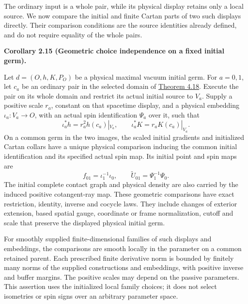 \documentclass[
  english,
  11pt,
  reqno]{amsart}
\makeatletter
\newcommand{\pandocstatementheading}[1]{%
  \par\if@nobreak\else
    \addpenalty{\@beginparpenalty}%
    \addvspace{.5\baselineskip plus .2\baselineskip minus .2\baselineskip}%
  \fi
  {\normalfont\bfseries #1\par}%
  \nobreak\@afterindenttrue\@afterheading
}
\makeatother
\begin{document}
The ordinary input is a whole pair, while its physical display retains
only a local source. We now compare the initial and finite Cartan parts
of two such displays directly. Their comparison conditions are the
source identities already defined, and do not require equality of the
whole pairs.

\pandocstatementheading{\leavevmode{}\label{cor:online-fixed-slice-geometric-choice-independence}Corollary 2.15 (Geometric choice independence on a fixed initial germ).}

Let \(d=(O,h,K,P_O)\) be a physical maximal vacuum initial germ. For
\(a=0,1\), let \(c_a\) be an ordinary pair in the selected domain of
\hyperref[thm:online-ordinary-negative-response-initial-source]{Theorem
4.18}. Execute the pair on its whole domain and restrict its actual
initial source to \(V_a\). Supply a positive scale \(r_a\), constant on
that spacetime display, and a physical embedding \(\iota_a:V_a\to O\),
with an actual spin identification \(\Psi_a\) over it, such that%
 \[
\iota_a^*h=r_a^2h(c_a)|_{V_a},\qquad
\iota_a^*K=r_aK(c_a)|_{V_a}.
\] On a common germ in the two images, the scaled initial gradients and
initialized Cartan collars have a unique physical comparison inducing
the common initial identification and its specified actual spin map. Its
initial point and spin maps are%
 \[
f_{01}=\iota_1^{-1}\iota_0,\qquad
\widetilde U_{01}=\Psi_1^{-1}\Psi_0.
\] The initial complete contact graph and physical density are also
carried by the induced positive cotangent-ray map. These geometric
comparisons have exact restriction, identity, inverse and cocycle laws.
They include changes of exterior extension, based spatial gauge,
coordinate or frame normalization, cutoff and scale that preserve the
displayed physical initial germ.

For smoothly supplied finite-dimensional families of such displays and
embeddings, the comparisons are smooth locally in the parameter on a
common retained parent. Each prescribed finite derivative norm is
bounded by finitely many norms of the supplied constructions and
embeddings, with positive inverse and buffer margins. The positive
scales may depend on the passive parameters. This assertion uses the
initialized local family choices; it does not select isometries or spin
signs over an arbitrary parameter space.
\end{document}
